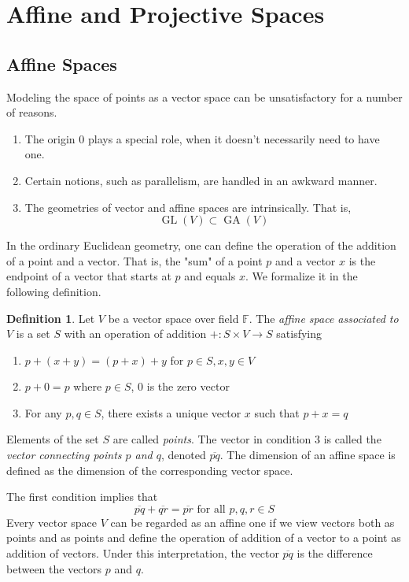 \documentclass{article}
\DeclareMathOperator{\GL}{GL}
\DeclareMathOperator{\GA}{GA}
\theoremstyle{remark}
\theoremstyle{definition}
\newtheorem{definition}{Definition}[section]
\begin{document}
\section{Affine and Projective Spaces}
\subsection{Affine Spaces}
Modeling the space of points as a vector space can be unsatisfactory for a number of reasons. 
\begin{enumerate}
    \item The origin $0$ plays a special role, when it doesn't necessarily need to have one. 
    \item Certain notions, such as parallelism, are handled in an awkward manner. 
    \item The geometries of vector and affine spaces are intrinsically. That is, 
    \[\GL(V) \subset \GA(V)\]
\end{enumerate}

In the ordinary Euclidean geometry, one can define the operation of the addition of a point and a vector. That is, the "sum" of a point $p$ and a vector $x$ is the endpoint of a vector that starts at $p$ and equals $x$. We formalize it in the following definition. 

\begin{definition}
Let $V$ be a vector space over field $\mathbb{F}$. The \textit{affine space associated to $V$} is a set $S$ with an operation of addition $+: S \times V \longrightarrow S$ satisfying 
\begin{enumerate}
    \item $p + (x + y) = (p + x) + y$ for $p \in S, x, y \in V$
    \item $p + 0 = p$ where $p \in S$, $0$ is the zero vector 
    \item For any $p, q \in S$, there exists a unique vector $x$ such that $p + x = q$
\end{enumerate}
Elements of the set $S$ are called \textit{points}. The vector in condition 3 is called the \textit{vector connecting points $p$ and $q$}, denoted $\overline{pq}$. The dimension of an affine space is defined as the dimension of the corresponding vector space. 
\end{definition}

The first condition implies that
\[\overline{pq} + \overline{qr} = \overline{pr} \text{ for all } p, q, r \in S\]
Every vector space $V$ can be regarded as an affine one if we view vectors both as points and as points and define the operation of addition of a vector to a point as addition of vectors. Under this interpretation, the vector $\overline{pq}$ is the difference between the vectors $p$ and $q$. 
\end{document}
